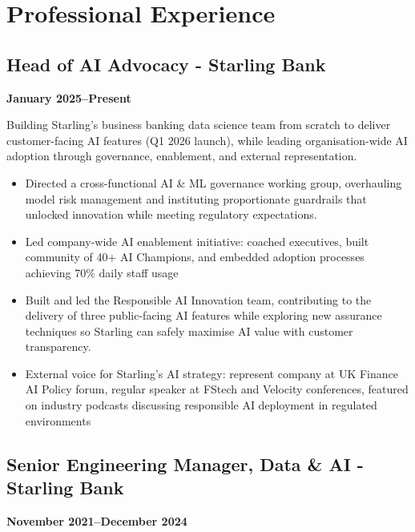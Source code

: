 \documentclass[a4paper]{scrartcl}
\begin{document}
\section*{Professional Experience}

\subsection*{Head of AI Advocacy - Starling Bank}
\textbf{January 2025--Present}

Building Starling's business banking data science team from scratch to deliver customer-facing AI features (Q1 2026 launch), while leading organisation-wide AI adoption through governance, enablement, and external representation.
\begin{itemize}
	\item Directed a cross-functional AI \& ML governance working group, overhauling model risk management and instituting proportionate guardrails that unlocked innovation while meeting regulatory expectations.
	\item Led company-wide AI enablement initiative: coached executives, built community of 40+ AI Champions, and embedded adoption processes achieving 70\% daily staff usage
	\item Built and led the Responsible AI Innovation team, contributing to the delivery of three public-facing AI features while exploring new assurance techniques so Starling can safely maximise AI value with customer transparency.
	\item External voice for Starling's AI strategy: represent company at UK Finance AI Policy forum, regular speaker at FStech and Velocity conferences, featured on industry podcasts discussing responsible AI deployment in regulated environments
\end{itemize}

\subsection*{Senior Engineering Manager, Data \& AI - Starling Bank}
\textbf{November 2021--December 2024}
\end{document}
